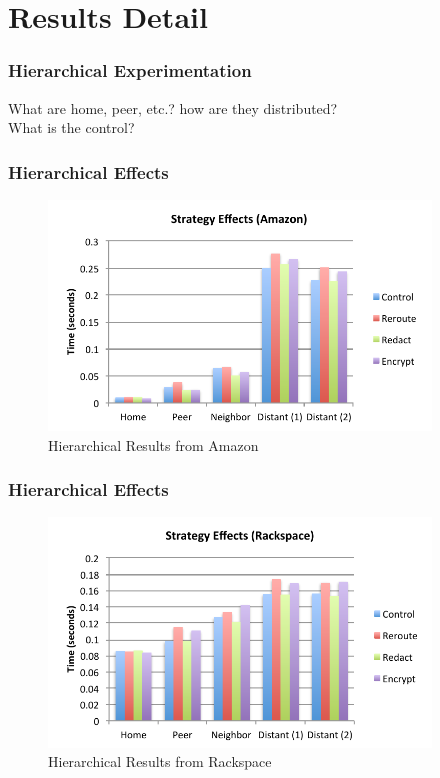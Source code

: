 \documentclass[t,handout]{beamer}
\begin{document}
\section{Results Detail}

\begin{frame}
\frametitle{Hierarchical Experimentation}
What are home, peer, etc.? how are they distributed? \\
What is the control? \\
\end{frame}

\begin{frame}
\frametitle{Hierarchical Effects}
\begin{figure}[!t]
\centering
\includegraphics[width=4in]{strategy_effects_az}
\caption{Hierarchical Results from Amazon}
\end{figure}
\end{frame}

\begin{frame}
\frametitle{Hierarchical Effects}
\begin{figure}[!t]
\centering
\includegraphics[width=4in]{strategy_effects_rs}
\caption{Hierarchical Results from Rackspace}
\end{figure}
\end{frame}
\end{document}
